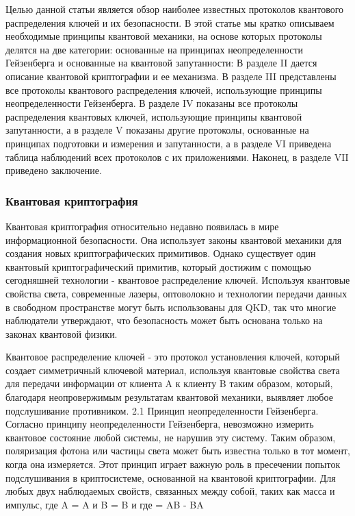 Целью данной статьи является обзор наиболее известных протоколов квантового распределения ключей и их безопасности. В этой статье мы кратко описываем необходимые принципы квантовой механики, на основе которых протоколы делятся на две категории: основанные на принципах неопределенности Гейзенберга и основанные на квантовой запутанности: В разделе II дается описание квантовой криптографии и ее механизма. В разделе III представлены все протоколы квантового распределения ключей, использующие принципы неопределенности Гейзенберга. В разделе IV показаны все протоколы распределения квантовых ключей, использующие принципы квантовой запутанности, а в разделе V показаны другие протоколы, основанные на принципах подготовки и измерения и запутанности, а в разделе VI приведена таблица наблюдений всех протоколов с их приложениями. Наконец, в разделе VII приведено заключение.

\subsubsection{Квантовая криптография}
Квантовая криптография относительно недавно появилась в мире информационной безопасности. Она использует законы квантовой механики для создания новых криптографических примитивов. Однако существует один квантовый криптографический примитив, который достижим с помощью сегодняшней технологии - квантовое распределение ключей. Используя квантовые свойства света, современные лазеры, оптоволокно и технологии передачи данных в свободном пространстве могут быть использованы для QKD, так что многие наблюдатели утверждают, что безопасность может быть основана только на законах квантовой физики.

Квантовое распределение ключей - это протокол установления ключей, который создает симметричный ключевой материал, используя квантовые свойства света для передачи информации от клиента A к клиенту B таким образом, который, благодаря неопровержимым результатам квантовой механики, выявляет любое подслушивание противником.
2.1 Принцип неопределенности Гейзенберга. Согласно принципу неопределенности Гейзенберга, невозможно измерить квантовое состояние любой системы, не нарушив эту систему. Таким образом, поляризация фотона или частицы света может быть известна только в тот момент, когда она измеряется. Этот принцип играет важную роль в пресечении попыток подслушивания в криптосистеме, основанной на квантовой криптографии.
Для любых двух наблюдаемых свойств, связанных между собой, таких как масса и импульс, где A = A и B = B и где = AB - BA

